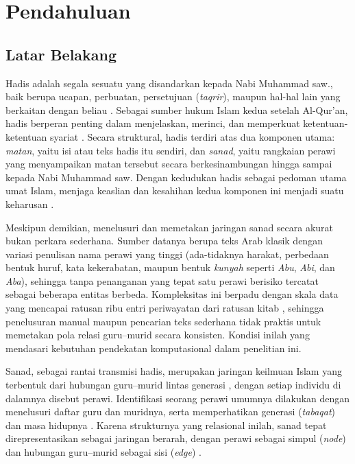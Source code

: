 \chapter{Pendahuluan}

\section{Latar Belakang}

Hadis adalah segala sesuatu yang disandarkan kepada Nabi Muhammad saw., baik berupa ucapan, perbuatan, persetujuan (\textit{taqrir}), maupun hal-hal lain yang berkaitan dengan beliau \cite{handayani2026hadis}.
Sebagai sumber hukum Islam kedua setelah Al-Qur'an, hadis berperan penting dalam menjelaskan, merinci, dan memperkuat ketentuan-ketentuan syariat \cite{hatta2026teknik}.
Secara struktural, hadis terdiri atas dua komponen utama: \textit{matan}, yaitu isi atau teks hadis itu sendiri, dan \textit{sanad}, yaitu rangkaian perawi yang menyampaikan matan tersebut secara berkesinambungan hingga sampai kepada Nabi Muhammad saw.
Dengan kedudukan hadis sebagai pedoman utama umat Islam, menjaga keaslian dan kesahihan kedua komponen ini menjadi suatu keharusan \cite{Mustang_Abubakar_2025}.

Meskipun demikian, menelusuri dan memetakan jaringan sanad secara akurat bukan perkara sederhana. Sumber datanya berupa teks Arab klasik dengan variasi penulisan nama perawi yang tinggi (ada-tidaknya harakat, perbedaan bentuk huruf, kata kekerabatan, maupun bentuk \textit{kunyah} seperti \textit{Abu}, \textit{Abi}, dan \textit{Aba}), sehingga tanpa penanganan yang tepat satu perawi berisiko tercatat sebagai beberapa entitas berbeda. Kompleksitas ini berpadu dengan skala data yang mencapai ratusan ribu entri periwayatan dari ratusan kitab \cite{MGHARI2022108540}, sehingga penelusuran manual maupun pencarian teks sederhana tidak praktis untuk memetakan pola relasi guru--murid secara konsisten. Kondisi inilah yang mendasari kebutuhan pendekatan komputasional dalam penelitian ini.

Sanad, sebagai rantai transmisi hadis, merupakan jaringan keilmuan Islam yang terbentuk dari hubungan guru--murid lintas generasi \cite{hatta2026teknik}, dengan setiap individu di dalamnya disebut perawi. Identifikasi seorang perawi umumnya dilakukan dengan menelusuri daftar guru dan muridnya, serta memperhatikan generasi (\textit{tabaqat}) dan masa hidupnya \cite{WanKamalNadzif2025135}. Karena strukturnya yang relasional inilah, sanad tepat direpresentasikan sebagai jaringan berarah, dengan perawi sebagai simpul (\textit{node}) dan hubungan guru--murid sebagai sisi (\textit{edge}) \cite{FAROOQI2024110439}.

